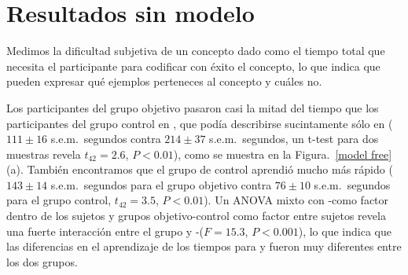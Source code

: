\section{Resultados sin modelo}


Medimos la dificultad subjetiva de un concepto dado como el tiempo total que necesita el participante para codificar con éxito el concepto, lo que indica que pueden expresar qué ejemplos perteneces al concepto y cuáles no.



Los participantes del grupo objetivo pasaron casi la mitad del tiempo que los participantes del grupo control en \testa, que podía describirse sucintamente sólo en \gramboolxor ($111\pm16$ s.e.m.\ segundos contra $214\pm37$ s.e.m.\ segundos, un t-test para dos muestras revela $t_{42}=2.6$, $P<0.01$), como se muestra en la Figura.~\ref{model free} (a). También encontramos que el grupo de control aprendió mucho más rápido \testb ($143\pm14$ s.e.m.\ segundos para el grupo objetivo contra $76\pm10$ s.e.m.\ segundos para el grupo control, $t_{42}=3.5$, $P<0.01$). Un ANOVA mixto con \testa-\testb como factor dentro de los sujetos y grupos objetivo-control como factor entre sujetos revela una fuerte interacción entre el grupo y \testa-\testb ($F=15.3$, $P<0.001$), lo que indica que las diferencias en el aprendizaje de los tiempos para \testa y \testb fueron muy diferentes entre los dos grupos.

